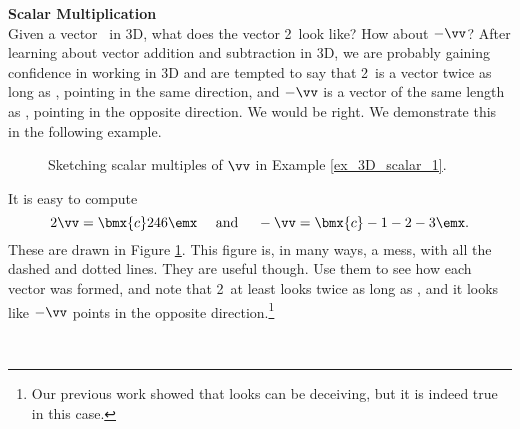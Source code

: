 \noindent \large \textsf{\textbf{Scalar Multiplication}} \normalsize\\

Given a vector \vv\ in 3D, what does the vector 2\vv\ look like? How about $-\vv$? After learning about vector addition and subtraction in 3D, we are probably gaining confidence in working in 3D and are tempted to say that 2\vv\ is a vector twice as long as \vv, pointing in the same direction, and $-\vv$ is a vector of the same length as \vv, pointing in the opposite direction. We would be right. We demonstrate this in the following example.\\

{\begin{figure}[h!]
\begin{center}
\end{center}
\caption{Sketching scalar multiples of $\protect \vv$ in Example \ref{ex_3D_scalar_1}.}
\label{fig:3D_scalar_1}
\end{figure}

It is easy to compute $$2\vv = \bmx{c}2\\4\\6\emx \quad \text{ and } \quad -\vv = \bmx{c} -1\\-2\\-3\emx.$$ These are drawn in Figure \ref{fig:3D_scalar_1}. This figure is, in many ways, a mess, with all the dashed and dotted lines. They are useful though. Use them to see how each vector was formed, and note that 2\vv\ at least looks twice as long as \vv, and it looks like $-\vv$ points in the opposite direction.\footnote{Our previous work showed that looks can be deceiving, but it is indeed true in this case.} }\\ %

